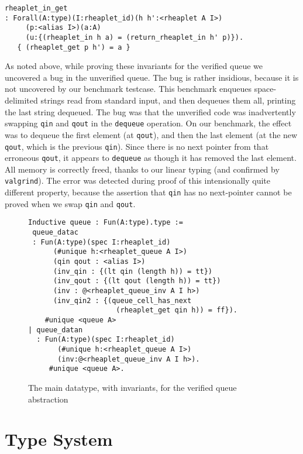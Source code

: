 \documentclass[9pt,natbib]{sigplanconf}
\begin{document}
{\small
\begin{verbatim}
rheaplet_in_get
: Forall(A:type)(I:rheaplet_id)(h h':<rheaplet A I>)
     (p:<alias I>)(a:A)
     (u:{(rheaplet_in h a) = (return_rheaplet_in h' p)}).
   { (rheaplet_get p h') = a }
\end{verbatim}
}
  
As noted above, while proving these invariants for the verified queue
we uncovered a bug in the unverified queue.  The bug is rather
insidious, because it is not uncovered by our benchmark testcase.
This benchmark enqueues space-delimited strings read from standard
input, and then dequeues them all, printing the last string dequeued.
The bug was that the unverified code was inadvertently swapping
\texttt{qin} and \texttt{qout} in the \texttt{dequeue} operation.  On
our benchmark, the effect was to dequeue the first element (at
\texttt{qout}), and then the last element (at the new \texttt{qout},
which is the previous \texttt{qin}).  Since there is no next pointer
from that erroneous \texttt{qout}, it appears to \texttt{dequeue} as
though it has removed the last element.  All memory is correctly
freed, thanks to our linear typing (and confirmed by
\texttt{valgrind}).  The error was detected during proof of this
intensionally quite different property, because the assertion that
\texttt{qin} has no next-pointer cannot be proved when we swap
\texttt{qin} and \texttt{qout}.

\begin{figure}
\begin{verbatim}
Inductive queue : Fun(A:type).type :=
 queue_datac
 : Fun(A:type)(spec I:rheaplet_id)
      (#unique h:<rheaplet_queue A I>)
      (qin qout : <alias I>)
      (inv_qin : {(lt qin (length h)) = tt})
      (inv_qout : {(lt qout (length h)) = tt})
      (inv : @<rheaplet_queue_inv A I h>)
      (inv_qin2 : {(queue_cell_has_next
                     (rheaplet_get qin h)) = ff}).
    #unique <queue A>
| queue_datan
  : Fun(A:type)(spec I:rheaplet_id)
       (#unique h:<rheaplet_queue A I>)
       (inv:@<rheaplet_queue_inv A I h>).
     #unique <queue A>.
\end{verbatim}
\caption{The main datatype, with invariants, for the verified queue abstraction}
\label{fig:queue2}
\end{figure}

\section{Type System}
\end{document}

